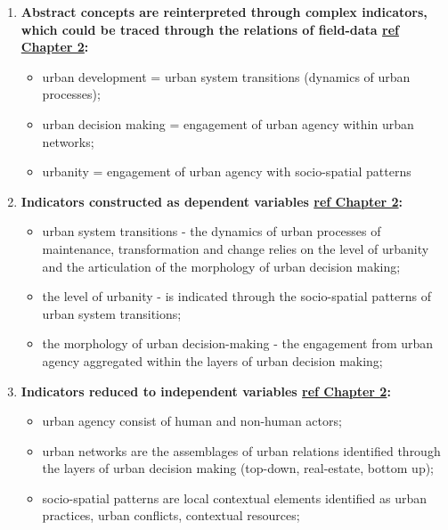 \documentclass[11pt]{report}
\begin{document}
\begin{enumerate}
\item \textbf{Abstract concepts are reinterpreted through complex indicators, which could be traced through the relations of field-data \href{ref}{ref Chapter 2}:}

\begin{itemize}
\item urban development = urban system transitions (dynamics of urban processes);
\item urban decision making = engagement of urban agency within urban networks;
\item urbanity = engagement of urban agency with socio-spatial patterns
\end{itemize}

\item \textbf{Indicators constructed as dependent variables \href{ref}{ref Chapter 2}:}
\begin{itemize}
\item urban system transitions - the dynamics of urban processes of maintenance, transformation and change relies on the level of urbanity and the articulation of the morphology of urban decision making;
\item the level of urbanity - is indicated through the socio-spatial patterns of urban system transitions;
\item the morphology of urban decision-making - the engagement from urban agency aggregated within the layers of urban decision making;
\end{itemize}

\item \textbf{Indicators reduced to independent variables \href{ref}{ref Chapter 2}:}
\begin{itemize}
\item urban agency consist of human and non-human actors;
\item urban networks are the assemblages of urban relations identified through the layers of urban decision making (top-down, real-estate, bottom up);
\item socio-spatial patterns are local contextual elements identified as urban practices, urban conflicts, contextual resources;
\end{itemize}
\end{enumerate}
\end{document}
